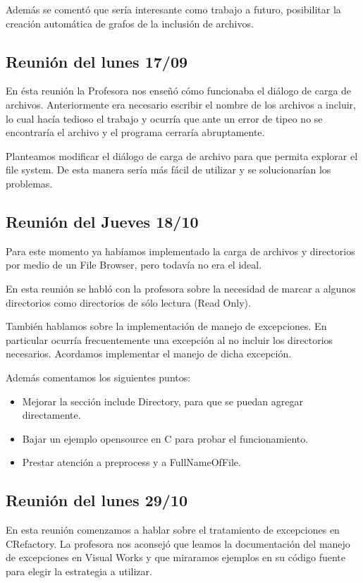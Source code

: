 \documentclass[a4paper,oneside,12pt]{article}
\begin{document}
Adem\'as se coment\'o que ser\'ia interesante como trabajo a futuro, posibilitar la creaci\'on autom\'atica de grafos de la inclusi\'on de archivos.

\subsection{Reuni\'on del lunes 17/09}
En \'esta reuni\'on la Profesora nos enseñ\'o c\'omo funcionaba el diálogo de carga de archivos. Anteriormente era necesario escribir el nombre de los archivos a incluir, lo cual hac\'ia tedioso el trabajo y ocurr\'ia que ante un error de tipeo no se encontrar\'ia el archivo y el programa cerrar\'ia abruptamente. 

Planteamos modificar el di\'alogo de carga de archivo para que permita explorar el file system. De esta manera ser\'ia m\'as f\'acil de utilizar y se solucionar\'ian los problemas.

\subsection{Reuni\'on del Jueves 18/10}
Para este momento ya hab\'iamos implementado la carga de archivos y directorios por medio de un File Browser, pero todav\'ia no era el ideal.

En esta reuni\'on se habl\'o con la profesora sobre la necesidad de marcar a algunos directorios como directorios de s\'olo lectura (Read Only).

Tambi\'en hablamos sobre la implementaci\'on de manejo de excepciones. En particular ocurr\'ia frecuentemente una excepci\'on al no incluir los directorios necesarios. Acordamos implementar el manejo de dicha excepci\'on.


Adem\'as comentamos los siguientes puntos:
\begin{itemize}
 \item Mejorar la secci\'on include Directory, para que se puedan agregar directamente.
 \item Bajar un ejemplo opensource en C para probar el funcionamiento.
 \item Prestar atenci\'on a preprocess y a FullNameOfFile.
\end{itemize}

\subsection{Reuni\'on del lunes 29/10}
En esta reuni\'on comenzamos a hablar sobre el tratamiento de excepciones en CRefactory. La profesora nos aconsejó que leamos la documentación del manejo de excepciones en Visual Works y que miraramos ejemplos en su código fuente para elegir la estrategia a utilizar.
\end{document}
